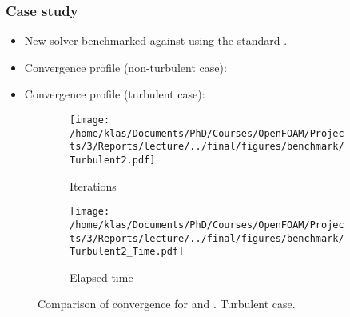 \documentclass[9pt,handout]{beamer} %
\begin{document}
\begin{frame}[t]%
\frametitle{Case study }
\begin{itemize}
    \item New solver benchmarked against  using the standard .
    \pause
    \item Convergence profile (non-turbulent case):
\end{itemize}

\end{frame}

\begin{frame}%
\begin{itemize}
    \item Convergence profile (turbulent case):
\end{itemize}
\begin{figure}[h]
\centering
\begin{subfigure}{0.49\textwidth}
    \centering
    \texttt{[image: /home/klas/Documents/PhD/Courses/OpenFOAM/Projects/3/Reports/lecture/../final/figures/benchmark/Turbulent2.pdf]}
    \caption{Iterations}
\end{subfigure}
\begin{subfigure}{0.49\textwidth}
    \centering
    \texttt{[image: /home/klas/Documents/PhD/Courses/OpenFOAM/Projects/3/Reports/lecture/../final/figures/benchmark/Turbulent2\_Time.pdf]}
    \caption{Elapsed time}
\end{subfigure}
    \caption{Comparison of convergence for  and . Turbulent case.}
    \label{fig:benchmark:turbulent}
\end{figure}
\end{frame}
\end{document}
